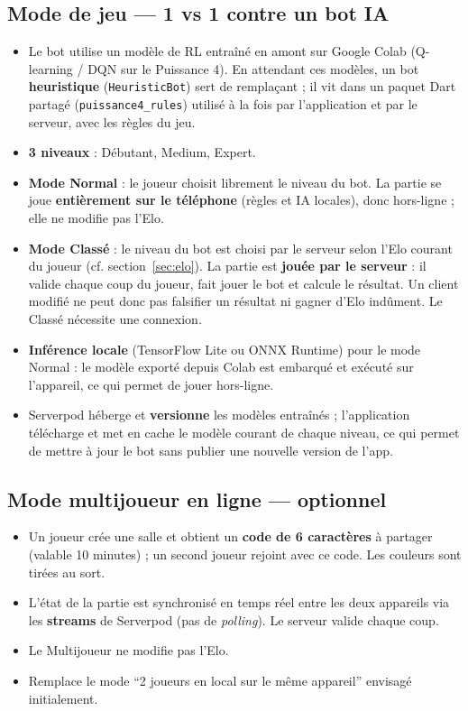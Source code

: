 \documentclass[a4paper,11pt]{article}
\begin{document}
\subsection{Mode de jeu --- 1 vs 1 contre un bot IA}
\label{sec:bot}
\begin{itemize}[leftmargin=1.5em]
  \item Le bot utilise un modèle de RL entraîné en amont sur Google Colab
        (Q-learning / DQN sur le Puissance 4). En attendant ces modèles, un bot
        \textbf{heuristique} (\texttt{HeuristicBot}) sert de remplaçant ; il vit
        dans un paquet Dart partagé (\texttt{puissance4\_rules}) utilisé à la fois
        par l'application et par le serveur, avec les règles du jeu.
  \item \textbf{3 niveaux} : Débutant, Medium, Expert.
  \item \textbf{Mode Normal} : le joueur choisit librement le niveau du bot. La
        partie se joue \textbf{entièrement sur le téléphone} (règles et IA locales),
        donc hors-ligne ; elle ne modifie pas l'Elo.
  \item \textbf{Mode Classé} : le niveau du bot est choisi par le serveur selon
        l'Elo courant du joueur (cf. section~\ref{sec:elo}). La partie est
        \textbf{jouée par le serveur} : il valide chaque coup du joueur, fait jouer
        le bot et calcule le résultat. Un client modifié ne peut donc pas falsifier
        un résultat ni gagner d'Elo indûment. Le Classé nécessite une connexion.
  \item \textbf{Inférence locale} (TensorFlow Lite ou ONNX Runtime) pour le mode
        Normal : le modèle exporté depuis Colab est embarqué et exécuté sur
        l'appareil, ce qui permet de jouer hors-ligne.
  \item Serverpod héberge et \textbf{versionne} les modèles entraînés ; l'application
        télécharge et met en cache le modèle courant de chaque niveau, ce qui permet
        de mettre à jour le bot sans publier une nouvelle version de l'app.
\end{itemize}

\subsection{Mode multijoueur en ligne --- optionnel}
\label{sec:multijoueur}
\begin{itemize}[leftmargin=1.5em]
  \item Un joueur crée une salle et obtient un \textbf{code de 6 caractères} à
        partager (valable 10 minutes) ; un second joueur rejoint avec ce code. Les
        couleurs sont tirées au sort.
  \item L'état de la partie est synchronisé en temps réel entre les deux appareils
        via les \textbf{streams} de Serverpod (pas de \textit{polling}). Le serveur
        valide chaque coup.
  \item Le Multijoueur ne modifie pas l'Elo.
  \item Remplace le mode ``2 joueurs en local sur le même appareil'' envisagé
        initialement.
\end{itemize}
\end{document}

